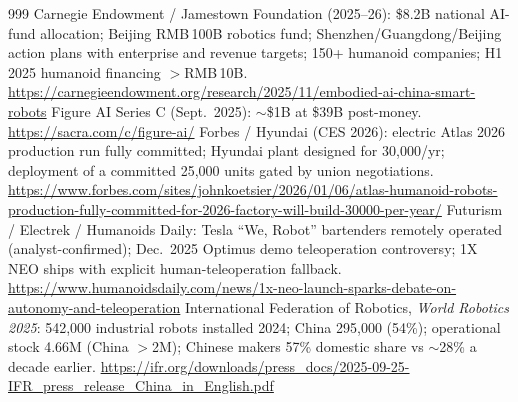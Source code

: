 \begin{thebibliography}{999}
 Carnegie Endowment / Jamestown Foundation (2025--26): \$8.2B national AI-fund allocation; Beijing RMB\,100B robotics fund; Shenzhen/Guangdong/Beijing action plans with enterprise and revenue targets; 150+ humanoid companies; H1 2025 humanoid financing $>$RMB\,10B. \url{https://carnegieendowment.org/research/2025/11/embodied-ai-china-smart-robots}
 Figure AI Series C (Sept.\ 2025): $\sim$\$1B at \$39B post-money. \url{https://sacra.com/c/figure-ai/}
 Forbes / Hyundai (CES 2026): electric Atlas 2026 production run fully committed; Hyundai plant designed for 30,000/yr; deployment of a committed 25,000 units gated by union negotiations. \url{https://www.forbes.com/sites/johnkoetsier/2026/01/06/atlas-humanoid-robots-production-fully-committed-for-2026-factory-will-build-30000-per-year/}
 Futurism / Electrek / Humanoids Daily: Tesla ``We, Robot'' bartenders remotely operated (analyst-confirmed); Dec.\ 2025 Optimus demo teleoperation controversy; 1X NEO ships with explicit human-teleoperation fallback. \url{https://www.humanoidsdaily.com/news/1x-neo-launch-sparks-debate-on-autonomy-and-teleoperation}
 International Federation of Robotics, \emph{World Robotics 2025}: 542,000 industrial robots installed 2024; China 295,000 (54\%); operational stock 4.66M (China $>$2M); Chinese makers 57\% domestic share vs $\sim$28\% a decade earlier. \url{https://ifr.org/downloads/press_docs/2025-09-25-IFR_press_release_China_in_English.pdf}


\end{thebibliography}
